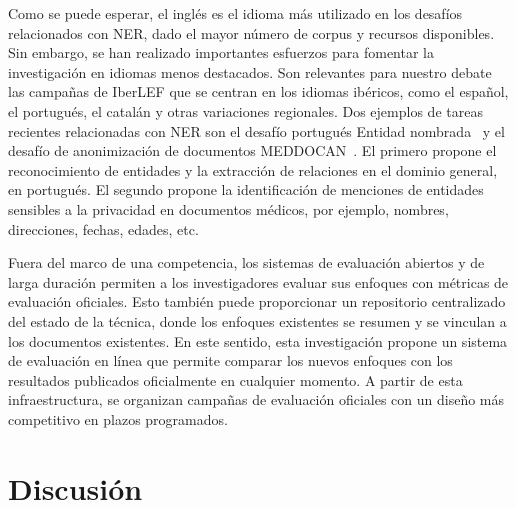 Como se puede esperar, el inglés es el idioma más utilizado en los desafíos relacionados con NER, dado el mayor número de corpus y recursos disponibles. Sin embargo, se han realizado importantes esfuerzos para fomentar la investigación en idiomas menos destacados. Son relevantes para nuestro debate las campañas de IberLEF que se centran en los idiomas ibéricos, como el español, el portugués, el catalán y otras variaciones regionales. Dos ejemplos de tareas recientes relacionadas con NER son el desafío portugués Entidad nombrada~\cite{glauber2019iberlef} y el desafío de anonimización de documentos MEDDOCAN~\cite{marimon2019automatic}. El primero propone el reconocimiento de entidades y la extracción de relaciones en el dominio general, en portugués. El segundo propone la identificación de menciones de entidades sensibles a la privacidad en documentos médicos, por ejemplo, nombres, direcciones, fechas, edades, etc.

Fuera del marco de una competencia, los sistemas de evaluación abiertos y de larga duración permiten a los investigadores evaluar sus enfoques con métricas de evaluación oficiales. Esto también puede proporcionar un repositorio centralizado del estado de la técnica, donde los enfoques existentes se resumen y se vinculan a los documentos existentes. En este sentido, esta investigación propone un sistema de evaluación en línea que permite comparar los nuevos enfoques con los resultados publicados oficialmente en cualquier momento. A partir de esta infraestructura, se organizan campañas de evaluación oficiales con un diseño más competitivo en plazos programados.

\section{Discusión}
